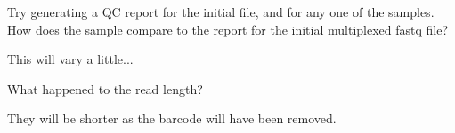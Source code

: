 \begin{questions}
Try generating a QC report for the initial file, and for any one of the samples. 
How does the sample compare to the report for the initial multiplexed fastq file? \\
\begin{answer}
This will vary a little...\\
\end{answer}
What happened to the read length? \\
\begin{answer}
They will be shorter as the barcode will have been removed.
\end{answer}
\end{questions}
